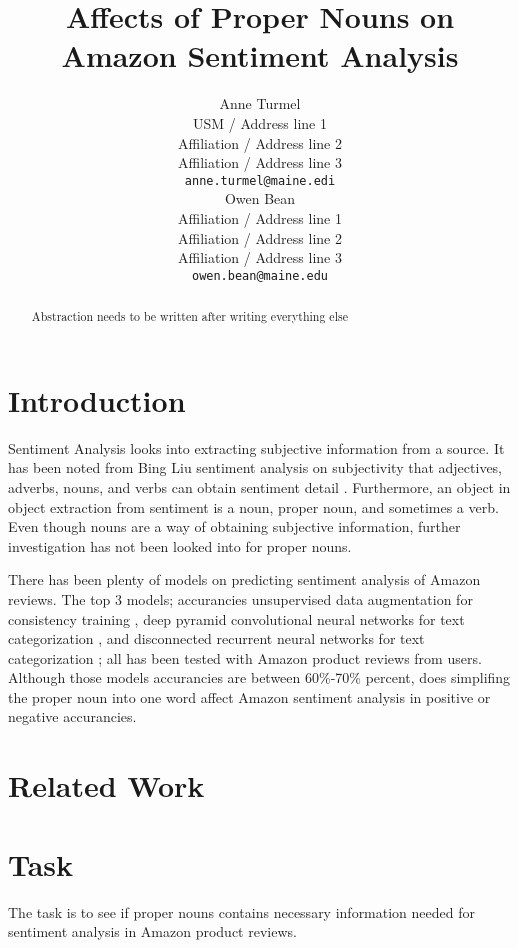 \documentclass[11pt,a4paper]{article}
\title{Affects of Proper Nouns on Amazon Sentiment Analysis}
\author{Anne Turmel \\
  USM / Address line 1 \\
  Affiliation / Address line 2 \\
  Affiliation / Address line 3 \\
  \texttt{anne.turmel@maine.edi} \\\And
  Owen Bean \\
  Affiliation / Address line 1 \\
  Affiliation / Address line 2 \\
  Affiliation / Address line 3 \\
  \texttt{owen.bean@maine.edu} \\}
\date{}
\begin{document}
\maketitle
\begin{abstract}
Abstraction needs to be written after writing everything else
\end{abstract}

\section{Introduction}


Sentiment Analysis looks into extracting subjective information from a source. It has been noted from Bing Liu sentiment analysis on subjectivity that adjectives, adverbs, nouns, and verbs can obtain sentiment detail \cite{subject}. Furthermore, an object in object extraction from sentiment is a noun, proper noun, and sometimes a verb. Even though nouns are a way of obtaining subjective information, further investigation has not been looked into for proper nouns.

There has been plenty of models on predicting sentiment analysis of Amazon reviews. The top 3 models; accurancies unsupervised data augmentation for consistency training \cite{unsupervised}, deep pyramid convolutional neural networks for text categorization \cite{pyramid}, and disconnected recurrent neural networks for text categorization \cite{disconnect}; all has been tested with Amazon product reviews from users. Although those models accurancies are between 60\%-70\% percent, does simplifing the proper noun into one word affect Amazon sentiment analysis in positive or negative accurancies.

\section{Related Work}

\section{Task}

The task is to see if proper nouns contains necessary information needed for sentiment analysis in Amazon product reviews.
\end{document}

